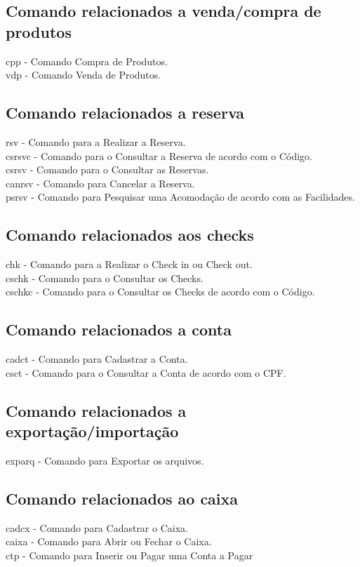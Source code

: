 \documentclass{article}
\begin{document}
 	\subsection{Comando relacionados a venda/compra de produtos}
	\textbullet cpp - Comando Compra de Produtos.\\
	\textbullet vdp - Comando Venda de Produtos.\\
	\subsection{Comando relacionados a reserva}
	\textbullet rsv - Comando para a Realizar a Reserva.\\
	\textbullet csrsvc - Comando para o Consultar a Reserva de acordo com o Código.\\
	\textbullet csrsv - Comando para o Consultar as Reservas.\\
	\textbullet canrsv - Comando para Cancelar a Reserva.\\
	\textbullet psrsv - Comando para Pesquisar uma Acomodação de acordo com as Facilidades.\\
	\subsection{Comando relacionados aos checks}
	\textbullet chk - Comando para a Realizar o Check in ou Check out.\\
	\textbullet cschk - Comando para o Consultar os Checks.\\
	\textbullet cschkc - Comando para o Consultar os Checks de acordo com o Código.\\
	\subsection{Comando relacionados a conta}
	\textbullet cadct - Comando para Cadastrar a Conta.\\
	\textbullet csct - Comando para o Consultar a Conta de acordo com o CPF.\\
	\subsection{Comando relacionados a exportação/importação}
	\textbullet exparq - Comando para Exportar os arquivos.\\
	\subsection{Comando relacionados ao caixa}
	\textbullet cadcx - Comando para Cadastrar o Caixa.\\
	\textbullet caixa - Comando para Abrir ou Fechar o Caixa.\\
	\textbullet ctp - Comando para Inserir ou Pagar uma Conta a Pagar\\
\end{document}

